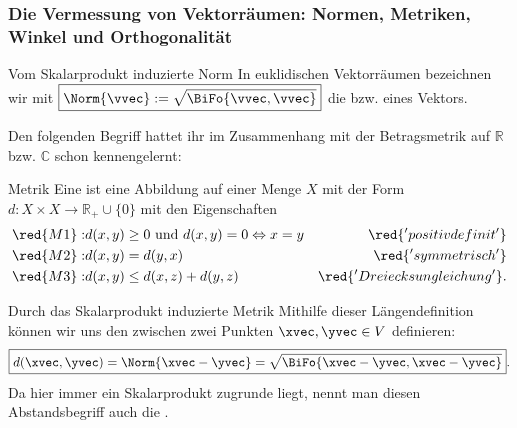 \subsubsection{Die Vermessung von Vektorräumen: Normen, Metriken, Winkel und Orthogonalität}
\begin{Def}
{Vom Skalarprodukt induzierte Norm}
In euklidischen Vektorräumen bezeichnen wir mit $\boxed{\Norm{\vvec}:=\sqrt{\BiFo{\vvec,\vvec}}}$ die  bzw.  eines Vektors.\\
\end{Def}
Den folgenden Begriff hattet ihr im Zusammenhang mit der Betragsmetrik auf $\mathbb{R}$ bzw. $\mathbb{C}$ schon kennengelernt:
\begin{Wiederholung}
{Metrik}
Eine  ist eine Abbildung auf einer Menge $X$ mit der Form $d:X\times X\rightarrow \mathbb{R}_+\cup \{0\}$ mit den Eigenschaften
\begin{eqnarray*}
\red{M1}: & d(x,y)\geq 0\text{ und } d(x,y)=0\Leftrightarrow x= y &\red{'positiv definit'}\\
\red{M2}: & d(x,y)=d(y, x) &\red{'symmetrisch'}\\
\red{M3}: & d(x,y)\leq d(x, z)+d(y,z) & \red{'Dreiecksungleichung'}.
\end{eqnarray*}
\end{Wiederholung}
\begin{Def}
{Durch das Skalarprodukt induzierte Metrik}
Mithilfe dieser Längendefinition können wir uns den  zwischen zwei Punkten $\xvec,\yvec\in V$ definieren:
\begin{equation}
    \boxed{d(\xvec,\yvec)=\Norm{\xvec-\yvec}=\sqrt{\BiFo{\xvec-\yvec,\xvec-\yvec}}}.
\end{equation}
Da hier immer ein Skalarprodukt zugrunde liegt, nennt man diesen Abstandsbegriff auch die .\\
\end{Def}
